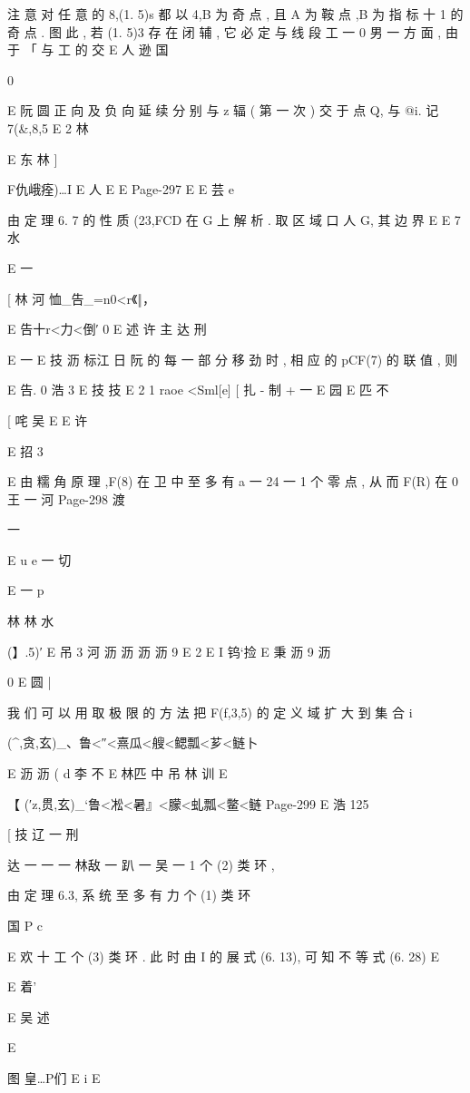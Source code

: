 {{{{{{{{{{{{{{{注 意 对 任 意 的 8,(1. 5)s 都 以 4,B 为 奇 点 , 且 A 为 鞍 点 ,B 为
指 标 十 1 的 奇 点 . 图 此 , 若 (1. 5)3 存 在 闭 辅 , 它 必 定 与 线 段 工 一
0 男 一 方 面 , 由 于 「 与 工 的 交
E 人 逊 国

0

E 阮 圆
正 向 及 负 向 延 续 分 别 与 z 辐 ( 第 一 次 ) 交 于 点 Q, 与 @i. 记 7(&,8,5
E 2 林

E 东 林
]

F仇峨痊)…I E 人
E
E
Page-297
E E 芸 e

由 定 理 6. 7 的 性 质 (23,FCD 在 G 上 解 析 . 取 区 域 口 人 G, 其 边 界
E
E 7 水

E
一

[ 林 河 恤_告_=n0<r《‖，

E 告十r<力<倒′
0
E 述 许 主 达 刑

E 一
E 技 沥 标江 日 阮
的 每 一 部 分 移 劲 时 , 相 应 的 pCF(7) 的 联 值 , 则

E 告. 0 浩 3
E 技 技
E 2 1
raoe <Sml[e] [ 扎 - 制 + 一
E 园
E 匹 不

[ 咤 吴
E
E 许

E 招 3

E
由 糯 角 原 理 ,F(8) 在 卫 中 至 多 有 a 一 24 一 1 个 零 点 , 从 而 F(R) 在
0 王 一 河
Page-298
渡

一

E
u e 一 切

E 一
p

林 林 水

(】.5)′
E 吊 3 河 沥 沥 沥 沥 9
E
2
E I 钨`捡 E 秉 沥 9
沥

0
E 圆 |

我 们 可 以 用 取 极 限 的 方 法 把 F(f,3,5) 的 定 义 域 扩 大 到 集 合
i {(^,贪,玄)_、鲁<″<熹瓜<艘<鳃瓢<芗<鲢卜

E 沥 沥 ( d 李 不
E 林匹 中 吊 林 训
E

【 {(′z,贯,玄)_`鲁<凇<暑』<朦<虬瓢<鳖<鲢}
Page-299
E 浩 125

[ 技 辽 一 刑

达 一 一 一 林敌
一
趴 一 吴 一 1 个 (2) 类 环 ,

由 定 理 6.3, 系 统 至 多 有 力 个 (1) 类 环

国 P
c

E
欢 十 工 个 (3) 类 环 . 此 时 由 I 的 展 式 (6. 13), 可 知 不 等 式 (6. 28)
E

E 着'

E 吴
述

E

图 皇…P们 E i
E

}}}}}}}}}}}}}}}}

